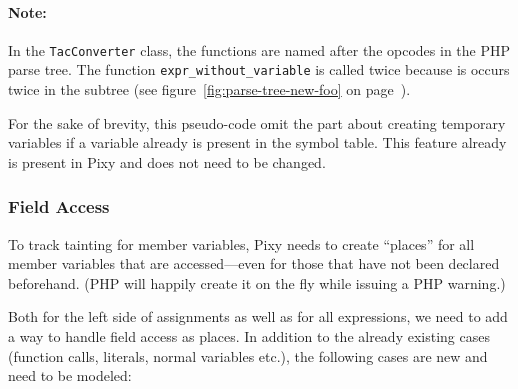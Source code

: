\paragraph{Note:} In the \texttt{TacConverter} class, the functions are named after the opcodes in the PHP parse tree. The function \texttt{expr\_without\_variable} is called twice because is occurs twice in the subtree (see figure~\ref{fig:parse-tree-new-foo} on page~\pageref{fig:parse-tree-new-foo}).

For the sake of brevity, this pseudo-code omit the part about creating temporary variables if a variable already is present in the symbol table. This feature already is present in Pixy and does not need to be changed.

\subsubsection{Field Access}

To track tainting for member variables, Pixy needs to create ``places'' for all member variables that are accessed---even for those that have not been declared beforehand. (PHP will happily create it on the fly while issuing a PHP warning.)

Both for the left side of assignments as well as for all expressions, we need to add a way to handle field access as places. In addition to the already existing cases (\eg function calls, literals, normal variables etc.), the following cases are new and need to be modeled:

